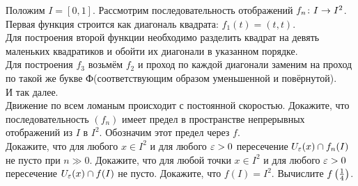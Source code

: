 \documentclass[a4paper,12pt]{article}
\begin{document}
Положим $I = [0,1]$. Рассмотрим последовательность отображений $f_n \colon I \rightarrow I^2$.\\
Первая функция строится как диагональ квадрата: $f_1(t) = (t,t)$.\\
Для построения второй функции необходимо разделить квадрат на девять маленьких квадратиков и обойти их диагонали в указанном порядке.\\
Для построения $f_3$ возьмём $f_2$ и проход по каждой диагонали заменим на проход по такой же  букве Ф (соответствующим образом уменьшенной и повёрнутой).\\
И так далее.\\
Движение по всем ломаным происходит с постоянной скоростью.
Докажите, что последовательность $(f_n)$ имеет предел в пространстве непрерывных отображений из $I$ в $I^2$. Обозначим этот предел через $f$.\\
Докажите, что для любого $x \in I^2$ и для любого $\varepsilon>0$ пересечение $U_{\varepsilon}(x) \cap f_n(I)$ не пусто при $n\gg0$.
Докажите, что для любой точки $x \in I^2$ и для любого $\varepsilon>0$ пересечение $U_{\varepsilon}(x) \cap f(I)$ не пусто.
Докажите, что $f(I) = I^2$.
Вычислите $f\left(\frac14\right)$.


\GenXMLW
\end{document}
